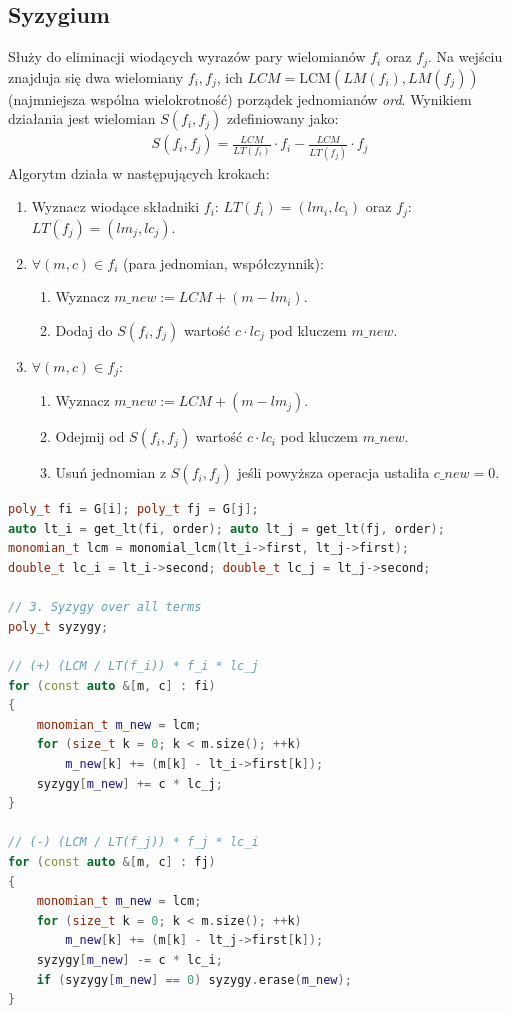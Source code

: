 \documentclass[10pt, a4paper]{article}
\begin{document}
\subsection{Syzygium}

Służy do eliminacji wiodących wyrazów pary wielomianów $f_i$ oraz $f_j$. 
Na wejściu znajduja się dwa wielomiany $f_i, f_j$, ich $LCM=\text{LCM}(LM(f_i), LM(f_j))$ 
(najmniejsza wspólna wielokrotność) porządek jednomianów \textit{ord}. 
Wynikiem działania jest wielomian $S(f_i, f_j)$ zdefiniowany jako:
\begin{align*}
    S(f_i, f_j) = \frac{LCM}{LT(f_i)} \cdot f_i - \frac{LCM}{LT(f_j)} \cdot f_j
\end{align*}
Algorytm działa w następujących krokach:
\begin{enumerate}
    \item Wyznacz wiodące składniki $f_i$: $LT(f_i) = (lm_i, lc_i)$ oraz $f_j$: $LT(f_j) = (lm_j, lc_j)$.
    \item $\forall (m,c)\in f_i$ (para jednomian, współczynnik):
    \begin{enumerate}
        \item Wyznacz $m\_new := LCM + (m - lm_i)$.
        \item Dodaj do $S(f_i,f_j)$ wartość $c \cdot lc_j$ pod kluczem $m\_new$.
    \end{enumerate}
    \item $\forall (m,c)\in f_j$:
    \begin{enumerate}
        \item Wyznacz $m\_new := LCM + (m - lm_j)$.
        \item Odejmij od $S(f_i,f_j)$ wartość $c \cdot lc_i$ pod kluczem $m\_new$.
        \item Usuń jednomian z $S(f_i,f_j)$ jeśli powyższa operacja ustaliła $c\_new=0$.
    \end{enumerate}
\end{enumerate}

\begin{lstlisting}[language=c++]
poly_t fi = G[i]; poly_t fj = G[j];
auto lt_i = get_lt(fi, order); auto lt_j = get_lt(fj, order);
monomian_t lcm = monomial_lcm(lt_i->first, lt_j->first);
double_t lc_i = lt_i->second; double_t lc_j = lt_j->second;

// 3. Syzygy over all terms
poly_t syzygy;

// (+) (LCM / LT(f_i)) * f_i * lc_j
for (const auto &[m, c] : fi)
{
    monomian_t m_new = lcm;
    for (size_t k = 0; k < m.size(); ++k)
        m_new[k] += (m[k] - lt_i->first[k]);
    syzygy[m_new] += c * lc_j;
}

// (-) (LCM / LT(f_j)) * f_j * lc_i
for (const auto &[m, c] : fj)
{
    monomian_t m_new = lcm;
    for (size_t k = 0; k < m.size(); ++k)
        m_new[k] += (m[k] - lt_j->first[k]);
    syzygy[m_new] -= c * lc_i;
    if (syzygy[m_new] == 0) syzygy.erase(m_new);
}
\end{lstlisting}
\end{document}
